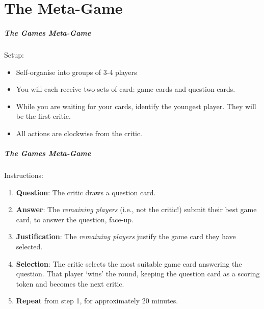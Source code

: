 







\part{The Meta-Game}
\frame{\partpage}

\begin{frame}
	\frametitle{The Games Meta-Game}
	
	Setup:
	
	\begin{itemize}
		\item Self-organise into groups of 3-4 players
		\item You will each receive two sets of card: game cards and question cards.
		\item While you are waiting for your cards, identify the youngest player. They will be the first critic.
		\item All actions are clockwise from the critic.
	\end{itemize}
\end{frame}

\begin{frame}
	\frametitle{The Games Meta-Game}
	
	Instructions:
	
	\begin{enumerate}
		\item 	\textbf{Question}: The critic draws a question card. 
		\item 	\textbf{Answer}: The \textit{remaining players} (i.e., not the critic!) submit their best game card, to answer the question, face-up.
		\item 	\textbf{Justification}: The \textit{remaining players} justify the game card they have selected.
		\item 	\textbf{Selection}: The critic selects the most suitable game card answering the question. That player `wins' the round, keeping the question card as a scoring token
			and becomes the next critic.	
		\item 	\textbf{Repeat} from step 1, for approximately 20 minutes.	
	\end{enumerate}
\end{frame}
   
